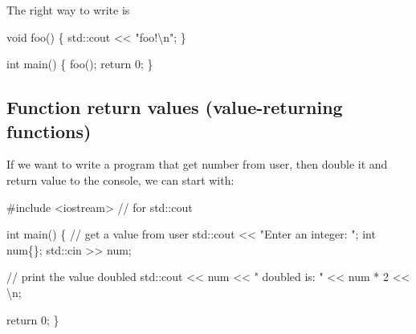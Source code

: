 \documentclass[
  letterpaper,
  DIV=11,
  numbers=noendperiod]{scrreprt}
\newenvironment{Shaded}{\begin{snugshade}}{\end{snugshade}}
\newcommand{\CommentTok}[1]{\textcolor[rgb]{0.37,0.37,0.37}{#1}}
\newcommand{\DecValTok}[1]{\textcolor[rgb]{0.68,0.00,0.00}{#1}}
\newcommand{\ErrorTok}[1]{\textcolor[rgb]{0.68,0.00,0.00}{#1}}
\newcommand{\FunctionTok}[1]{\textcolor[rgb]{0.28,0.35,0.67}{#1}}
\newcommand{\NormalTok}[1]{\textcolor[rgb]{0.00,0.23,0.31}{#1}}
\newcommand{\SpecialCharTok}[1]{\textcolor[rgb]{0.37,0.37,0.37}{#1}}
\newcommand{\StringTok}[1]{\textcolor[rgb]{0.13,0.47,0.30}{#1}}
\begin{document}
The right way to write is

\begin{Shaded}
\begin{Highlighting}[]
\NormalTok{void }\FunctionTok{foo}\NormalTok{() }
\NormalTok{\{}
\NormalTok{    std}\SpecialCharTok{::}\NormalTok{cout }\SpecialCharTok{\textless{}}\ErrorTok{\textless{}} \StringTok{"foo!}\SpecialCharTok{\textbackslash{}n}\StringTok{"}\NormalTok{;}
\NormalTok{\}}

\NormalTok{int }\FunctionTok{main}\NormalTok{()}
\NormalTok{\{}
    \FunctionTok{foo}\NormalTok{();}
\NormalTok{    return }\DecValTok{0}\NormalTok{;}
\NormalTok{\}}
\end{Highlighting}
\end{Shaded}

\hypertarget{function-return-values-value-returning-functions}{%
\subsection{Function return values (value-returning
functions)}\label{function-return-values-value-returning-functions}}

If we want to write a program that get number from user, then double it
and return value to the console, we can start with:

\begin{Shaded}
\begin{Highlighting}[]
\CommentTok{\#include \textless{}iostream\textgreater{}     // for std::cout}

\NormalTok{int }\FunctionTok{main}\NormalTok{()}
\NormalTok{\{}
    \SpecialCharTok{/}\ErrorTok{/}\NormalTok{ get a value from user}
\NormalTok{    std}\SpecialCharTok{::}\NormalTok{cout }\SpecialCharTok{\textless{}}\ErrorTok{\textless{}} \StringTok{"Enter an integer: "}\NormalTok{;}
\NormalTok{    int num\{\};}
\NormalTok{    std}\SpecialCharTok{::}\NormalTok{cin }\SpecialCharTok{\textgreater{}}\ErrorTok{\textgreater{}}\NormalTok{ num;}

    \SpecialCharTok{/}\ErrorTok{/}\NormalTok{ print the value doubled}
\NormalTok{    std}\SpecialCharTok{::}\NormalTok{cout }\SpecialCharTok{\textless{}}\ErrorTok{\textless{}}\NormalTok{ num }\SpecialCharTok{\textless{}}\ErrorTok{\textless{}} \StringTok{" doubled is: "} \SpecialCharTok{\textless{}}\ErrorTok{\textless{}}\NormalTok{ num }\SpecialCharTok{*} \DecValTok{2} \SpecialCharTok{\textless{}}\ErrorTok{\textless{}} \StringTok{\textquotesingle{}}\SpecialCharTok{\textbackslash{}n}\StringTok{\textquotesingle{}}\NormalTok{;}

\NormalTok{    return }\DecValTok{0}\NormalTok{;}
\NormalTok{\}}
\end{Highlighting}
\end{Shaded}
\end{document}
